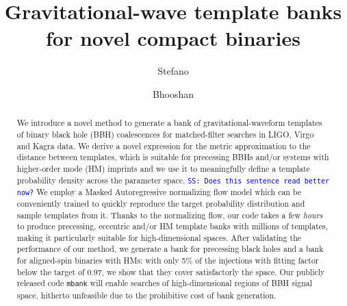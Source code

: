 \documentclass[twocolumn,showpacs,preprintnumbers,nofootinbib,prd,
superscriptaddress,10pt]{revtex4-2}
\newcommand{\stefano}[1]{{\textcolor{blue}{\texttt{SS: #1}} }}
\begin{document}
\begin{abstract}
	We introduce a novel method to generate a bank of gravitational-waveform templates of binary black hole (BBH) coalescences for matched-filter searches in LIGO, Virgo and Kagra data.
	We derive a novel expression for the metric approximation to the distance between templates, which is suitable for precessing BBHs and/or systems with higher-order mode (HM) imprints and we use it to meaningfully define a template probability density across the parameter space.
	\stefano{Does this sentence read better now?}
	We employ a Masked Autoregressive normalizing flow model which can be conveniently trained to quickly reproduce the target probability distribution and sample templates from it. Thanks to the normalizing flow, our code takes a few {\it hours} to produce precessing, eccentric and/or HM template banks with millions of templates, making it particularly suitable for high-dimensional spaces.
	After validating the performance of our method, we generate a bank for precessing black holes and a bank for aligned-spin binaries with HMs: with only 5\% of the injections with fitting factor below the target of $0.97$, we show that they cover satisfactorly the space.
	Our publicly released code \texttt{mbank} will enable searches of high-dimensional regions of BBH signal space, hitherto unfeasible due to the prohibitive cost of bank generation.
	
\end{abstract}
	
 \title{Gravitational-wave template banks for novel compact binaries}
	\author{Stefano }

	\author{Bhooshan }
        
\end{document}

